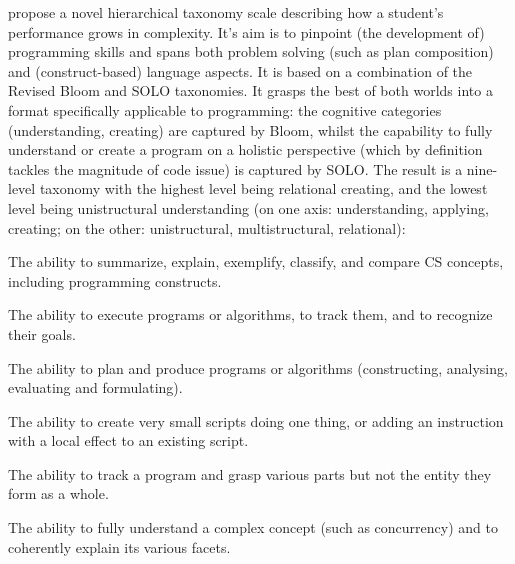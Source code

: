  propose a novel hierarchical taxonomy scale describing how a student’s performance grows in complexity. It’s aim is to pinpoint (the development of) programming skills and spans both problem solving (such as plan composition) and (construct-based) language aspects. It is based on a combination of the Revised Bloom and SOLO taxonomies.  It grasps the best of both worlds into a format specifically applicable to programming: the cognitive categories (understanding, creating) are captured by Bloom, whilst the capability to fully understand or create a program on a holistic perspective (which by definition tackles the magnitude of code issue) is captured by SOLO. The result is a nine-level taxonomy with the highest level being relational creating, and the lowest level being unistructural understanding (on one axis: understanding, applying, creating; on the other: unistructural, multistructural, relational):



\begin{description}[leftmargin=1em]
\item[Understanding:] The ability to summarize, explain, exemplify,
    classify, and compare CS concepts, including programming constructs.
\item[Applying:] The ability to execute programs or algorithms, to track
    them, and to recognize their goals.
\item[Creating:] The ability to plan and produce programs or algorithms
    (constructing, analysing, evaluating and formulating).
\item[Unistructural:] The ability to create very small scripts doing one
    thing, or adding an instruction with a local effect to an existing
    script.
\item[Multistructural:] The ability to track a program and grasp various
    parts but not the entity they form as a whole.
\item[Relational:] The ability to fully understand a complex concept (such
    as concurrency) and to coherently explain its various facets.
\end{description}


